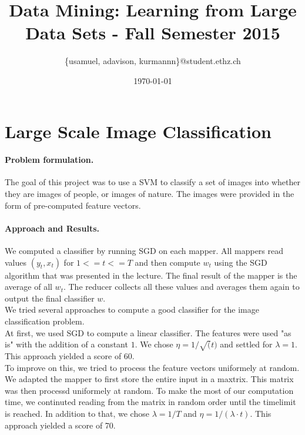 \documentclass[a4paper, 11pt]{article}
\title{Data Mining: Learning from Large Data Sets - Fall Semester 2015}
\author{\{usamuel, adavison, kurmannn\}@student.ethz.ch}
\date{\today}
\begin{document}
\maketitle

\section*{Large Scale Image Classification} 


\paragraph{Problem formulation.\!\!\!}
The goal of this project was to use a SVM to classify a set of images into whether they are images of people, or images of nature. The images were provided in the form of pre-computed feature vectors. 

\paragraph{Approach and Results.\!\!\!}
We computed a classifier by running SGD on each mapper. All mappers read values $(y_t,x_t)$ for $1 <= t <= T$ and then
compute $w_t$ using the SGD algorithm that was presented in the lecture. The final result of the mapper is the average of
all $w_t$. The reducer collects all these values and averages them again to output the final classifier $w$.
\\

We tried several approaches to compute a good classifier for the image classification problem.
\\

At first, we used SGD to compute a linear classifier. The features were used "as is" with the addition of a constant $1$.
We chose $\eta = 1/\sqrt(t)$ and settled for $\lambda = 1$. This approach yielded a score of $60$.
\\

To improve on this, we tried to process the feature vectors uniformely at random. 
We adapted the mapper to first store the entire input in a maxtrix. 
This matrix was then processd uniformely at random. To make the most of our computation time,
we continuted reading from the matrix in random order until the timelimit is reached.
In addition to that, we chose $\lambda = 1/T$ and $\eta = 1/(\lambda \cdot t)$. 
This approach yielded a score of 70.
\\
\end{document}
